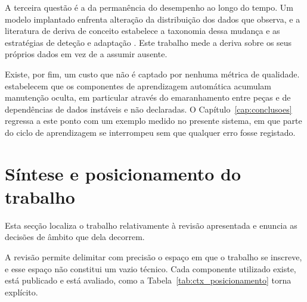 A terceira questão é a da permanência do desempenho ao longo do tempo. Um modelo implantado enfrenta
alteração da distribuição dos dados que observa, e a literatura de deriva de conceito estabelece a
taxonomia dessa mudança e as estratégias de deteção e adaptação \autocite{gama2014survey}. Este
trabalho mede a deriva sobre os seus próprios dados em vez de a assumir ausente.

Existe, por fim, um custo que não é captado por nenhuma métrica de qualidade.
\textcite{sculley2015debt} estabelecem que os componentes de aprendizagem automática acumulam
manutenção oculta, em particular através do emaranhamento entre peças e de dependências de dados
instáveis e não declaradas. O Capítulo~\ref{cap:conclusoes} regressa a este ponto com um exemplo
medido no presente sistema, em que parte do ciclo de aprendizagem se interrompeu sem que qualquer
erro fosse registado.

\section{Síntese e posicionamento do trabalho}
\label{sec:ctx_sintese}

Esta secção localiza o trabalho relativamente à revisão apresentada e enuncia as decisões de âmbito
que dela decorrem.

A revisão permite delimitar com precisão o espaço em que o trabalho se inscreve, e esse espaço não
constitui um vazio técnico. Cada componente utilizado existe, está publicado e está avaliado, como
a Tabela~\ref{tab:ctx_posicionamento} torna explícito.

